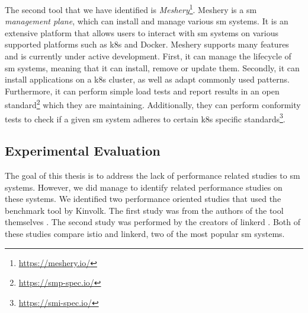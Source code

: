 The second tool that we have identified is \textit{Meshery}\footnote{\url{https://meshery.io/}}. Meshery is a \gls{sm} \textit{management plane}, which can install and manage various \gls{sm} systems. It is an extensive platform that allows users to interact with \gls{sm} systems on various supported platforms such as \gls{k8s} and Docker. Meshery supports many features and is currently under active development. First, it can manage the lifecycle of \gls{sm} systems, meaning that it can install, remove or update them. Secondly, it can install applications on a \gls{k8s} cluster, as well as adapt commonly used patterns. Furthermore, it can perform simple load tests and report results in an open standard\footnote{\url{https://smp-spec.io/}} which they are maintaining. Additionally, they can perform conformity tests to check if a  given \gls{sm} system adheres to certain \gls{k8s} specific standards\footnote{\url{https://smi-spec.io/}}.

\subsection{Experimental Evaluation}
\label{sec:background:related-work:experimental-evaluation}

The goal of this thesis is to address the lack of performance related studies to \gls{sm} systems. However, we did manage to identify related performance studies on these systems. We identified two performance oriented studies that used the benchmark tool by Kinvolk. The first study was from the authors of the tool themselves \cite{bench-istio-linkerd-2019}. The second study was performed by the creators of linkerd \cite{bench-istio-linkerd-2021}. Both of these studies compare istio and linkerd, two of the most popular \gls{sm} systems.
